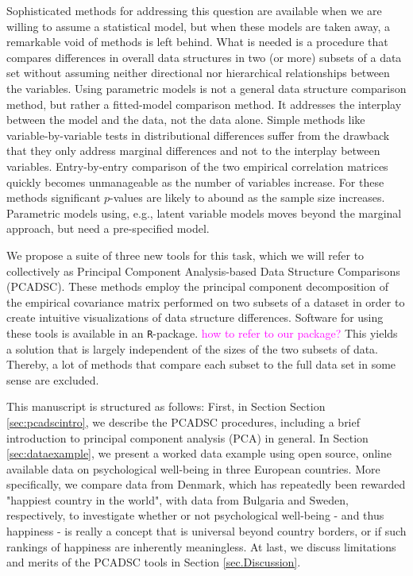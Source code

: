 \documentclass[titlepage,11pt,twoside]{article}
\newcommand{\hl}[1]{\textcolor{magenta}{#1}}
\begin{document}
Sophisticated methods for addressing this question are available when we are willing to assume a statistical model, but when these models are taken away, a remarkable void of methods is left behind. What is needed is a procedure that compares differences in overall data structures in two (or more) subsets of a data set without assuming neither directional nor hierarchical relationships between the variables. Using parametric models is not a general data structure comparison method, but rather a fitted-model comparison method. It addresses the interplay between the model and the data, not the data alone. 
Simple methods like variable-by-variable tests in distributional differences suffer from the drawback that they only address marginal differences and not to the interplay between variables. Entry-by-entry comparison of the two empirical correlation matrices quickly becomes unmanageable as the number of variables increase. For these methods significant $p$-values are likely to abound as the sample size increases. Parametric models using, e.g., latent variable models moves beyond the marginal approach, but need a pre-specified model.

We propose a suite of three new tools for this task, which we will refer to collectively as Principal Component Analysis-based Data Structure Comparisons (PCADSC). These methods employ the principal component decomposition of the empirical covariance matrix performed on two subsets of a dataset in order to create intuitive visualizations of data structure differences. Software for using these tools is available in an \texttt{R}-package. \hl{how to refer to our package?} This yields a solution that is largely independent of the sizes of the two subsets of data. Thereby, a lot of methods that compare each subset to the full data set in some sense are excluded.

This manuscript is structured as follows: First, in Section Section \ref{sec:pcadscintro}, we describe the PCADSC procedures, including a brief introduction to principal component analysis (PCA) in general. In Section \ref{sec:dataexample}, we present a worked data example using open source, online available data on psychological well-being in three European countries. More specifically, we compare data from Denmark, which has repeatedly been rewarded "happiest country in the world", with data from Bulgaria and Sweden, respectively, to investigate whether or not psychological well-being - and thus happiness - is really a concept that is universal beyond country borders, or if such rankings of happiness are inherently meaningless. At last, we discuss limitations and merits of the PCADSC tools in Section \ref{sec.Discussion}.
\end{document}
